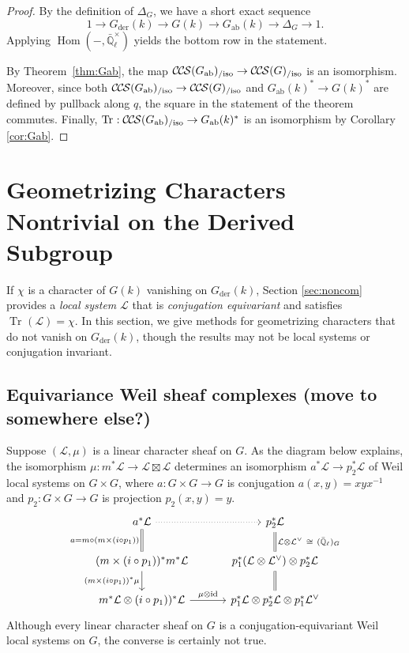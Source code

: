 \documentclass[10pt]{amsart}
\theoremstyle{plain}
\theoremstyle{definition}
\newcommand{\EE}{\mathbb{\bar Q}_\ell}
\newcommand{\EEx}{\EE^\times}
\DeclareMathOperator{\Hom}{Hom}
\DeclareMathOperator{\id}{id}
\newcommand{\der}{_{\operatorname{der}}}
\newcommand{\ab}{_{\operatorname{ab}}}
\newcommand{\iso}{{\ \cong\ }}
\DeclareMathOperator{\Tr}{Tr}
\newcommand{\TrFrob}[1]{\Tr_{#1}}
\newcommand{\cs}[1]{{\mathcal{#1}}}
\newcommand{\CCS}{{\mathcal{C\hskip-.8pt C\hskip-0.8pt S}}}
\newcommand{\CCSiso}[1]{\CCS(#1)_{/\text{iso}}}
\begin{document}
\begin{proof}
By the definition of $\Delta_G$, we have a short exact sequence
\[
1 \to G\der(k) \to G(k) \to G\ab(k) \to \Delta_G \to 1.
\]
Applying $\Hom(-, \EEx)$ yields the bottom row in the statement.

By Theorem~\ref{thm:Gab}, the map $\CCSiso{G\ab} \to \CCSiso{G}$ is an isomorphism.
Moreover, since both $\CCSiso{G\ab} \to \CCSiso{G}$ and $G\ab(k)^* \to G(k)^*$ are
defined by pullback along $q$, the square in the statement of the theorem commutes.
Finally, $\TrFrob{} : \CCSiso{G\ab} \to G\ab(k)^*$ is an isomorphism by Corollary \ref{cor:Gab}.
\end{proof}

\section{Geometrizing Characters Nontrivial on the Derived Subgroup} \label{sec:badchar}


If $\chi$ is a character of $G(k)$ vanishing on $G\der(k)$, Section \ref{sec:noncom} provides a \emph{local system} $\cs{L}$ that is \emph{conjugation equivariant} and satisfies $\TrFrob{}(\cs{L}) = \chi$.   In this section, we give methods for geometrizing characters that do not vanish on $G\der(k)$, though the results may not be local systems or conjugation invariant.


\subsection{Equivariance Weil sheaf complexes (move to somewhere else?)}\label{ssec:equivariant}

Suppose $(\cs{L},\mu)$ is a linear character sheaf on $G$. 
As the diagram below explains, the isomorphism $\mu : m^*\cs{L} \to \cs{L}\boxtimes\cs{L}$ determines an isomorphism $a^*\cs{L} \to p_2^*\cs{L}$ of Weil local systems on $G\times G$, where  $a : G\times G\to G$ is conjugation $a(x,y)=xyx^{-1}$ and $p_2: G\times G\to G$ is projection $p_2(x,y)=y$.
\[
\begin{tikzcd}[column sep = 30]
a^*\cs{L} \arrow[equal]{d}[swap]{a= m\circ (m\times (i\circ p_1))} \arrow[dotted]{r} & p_2^*\cs{L}  \\
(m\times (i\circ p_1))^* m^*\cs{L} \arrow{d}[swap]{(m\times (i\circ p_1))^*\mu}  & p_1^*(\cs{L} \otimes \cs{L}^\vee) \otimes p_2^*\cs{L} \arrow[equal]{u}[swap]{\cs{L}\otimes \cs{L}^\vee \iso (\EE)_{G}}\\
m^*\cs{L}\otimes (i\circ p_1))^*\cs{L} \arrow{r}{\mu \otimes \id} & p_1^*\cs{L} \otimes p_2^*\cs{L} \otimes p_1^*\cs{L}^\vee \arrow[equal]{u}
\end{tikzcd}
\]
Although every linear character sheaf on $G$ is a conjugation-equivariant Weil local systems on $G$, the converse is certainly not true. 
\end{document}
